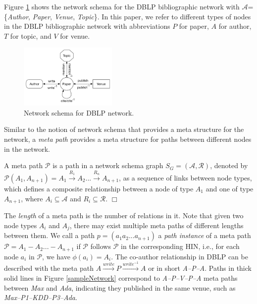 Figure \ref{schema} shows the network schema for the DBLP bibliographic network with $\mathcal{A}$=\{\textit{Author}, \textit{Paper}, \textit{Venue}, \textit{Topic}\}. In this paper, we refer to different types of nodes in the DBLP bibliographic network with abbreviations $P$ for paper, $A$ for author, $T$ for topic, and $V$ for venue. 

\begin{figure}[t]
\centering
\includegraphics[trim = 0mm 10mm 0mm 0mm,width=0.42\textwidth]{figs/schema.pdf}
\caption{Network schema for DBLP network.}\label{schema}
\end{figure}


Similar to the notion of network schema that provides a meta structure for the network, a \textit{meta path} \cite{sun2011pathsim} provides a meta structure for paths between different nodes in the network. 

\begin{definition}A meta path $\mathcal{P}$ is a path in a network schema graph $S_G = (\mathcal{A,R})$, denoted by $\mathcal{P}(A_1,A_{n+1}) = A_1 \xrightarrow{R_1} A_2... \xrightarrow{R_n} A_{n+1}$, as a sequence of links between node types, which defines a composite relationship between a node of type $A_1$ and one of type $A_{n+1}$, where $A_i \subseteq \mathcal{A}$ and $R_i \subseteq \mathcal{R}$. $\Box$\end{definition}

The \textit{length} of a meta path is the number of relations in it. Note that given two node types $A_i$ and $A_j$, there may exist multiple meta paths of different lengths between them. We call a path $p = (a_1a_2...a_{n+1})$ a \textit{path instance} of a meta path $\mathcal{P} = A_1-A_2... -A_{n+1}$ if $\mathcal{P}$ follows $\mathcal{P}$ in the corresponding HIN, i.e., for each node $a_i$ in $\mathcal{P}$, we have $\phi(a_i)=A_i$. The co-author relationship in DBLP can be described with the meta path $A\xrightarrow{write}P\xrightarrow{write^{-1}}A$ or in short \textit{A--P--A}. Paths in thick solid lines in Figure \ref{sampleNetwork} correspond to \textit{A--P--V--P--A} meta paths between \textit{Max} and \textit{Ada}, indicating they published in the same venue, such as \textit{Max--P1--KDD--P3--Ada}. 

